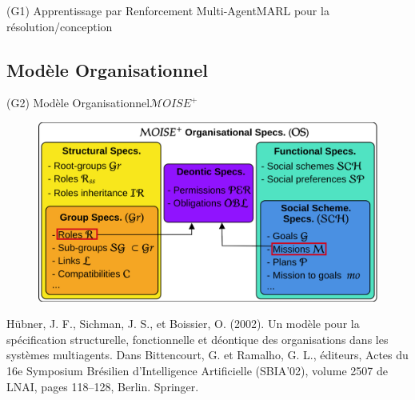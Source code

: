 \begin{frame}{(G1) Apprentissage par Renforcement Multi-Agent}{MARL pour la résolution/conception}
\end{frame}

\subsection{Modèle Organisationnel}

\begin{frame}{(G2) Modèle Organisationnel}{$\mathcal{M}OISE^+$}

    \begin{figure}
        \centering
        \includegraphics[width=0.75\linewidth]{figures/moise_model.png}
    \end{figure}

    \begin{spacing}{0.25}
        {\tiny Hübner, J. F., Sichman, J. S., et Boissier, O. (2002).
            Un modèle pour la spécification structurelle, fonctionnelle et déontique
            des organisations dans les systèmes multiagents.
            Dans Bittencourt, G. et Ramalho, G. L., éditeurs, Actes du 16e Symposium Brésilien d'Intelligence Artificielle (SBIA’02), volume 2507 de LNAI, pages 118–128, Berlin. Springer.}
    \end{spacing}

\end{frame}



